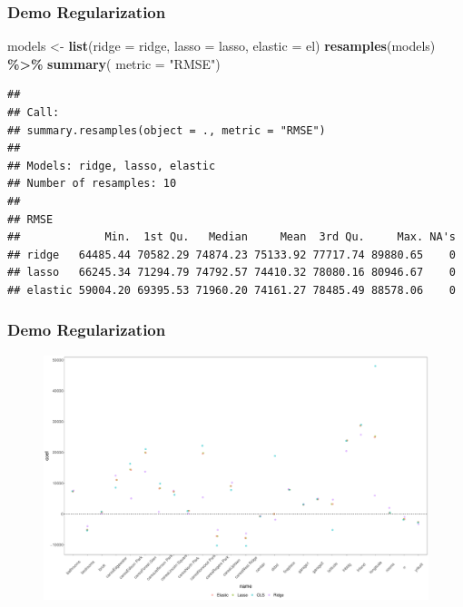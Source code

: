 \documentclass[
  shownotes,
  xcolor={svgnames},
  hyperref={colorlinks,citecolor=DarkBlue,linkcolor=DarkRed,urlcolor=DarkBlue}
  ]{beamer}
\newenvironment{Shaded}{\begin{snugshade}}{\end{snugshade}}
\newcommand{\DataTypeTok}[1]{\textcolor[rgb]{0.13,0.29,0.53}{#1}}
\newcommand{\KeywordTok}[1]{\textcolor[rgb]{0.13,0.29,0.53}{\textbf{#1}}}
\newcommand{\NormalTok}[1]{#1}
\newcommand{\OperatorTok}[1]{\textcolor[rgb]{0.81,0.36,0.00}{\textbf{#1}}}
\newcommand{\StringTok}[1]{\textcolor[rgb]{0.31,0.60,0.02}{#1}}
\begin{document}
\begin{frame}[fragile]
\frametitle{Demo Regularization}

\begin{scriptsize}
\begin{Shaded}
\begin{Highlighting}[]
\NormalTok{models \textless{}{-}}\StringTok{ }\KeywordTok{list}\NormalTok{(}\DataTypeTok{ridge =}\NormalTok{ ridge, }\DataTypeTok{lasso =}\NormalTok{ lasso, }\DataTypeTok{elastic =}\NormalTok{ el)}
\KeywordTok{resamples}\NormalTok{(models) }\OperatorTok{\%\textgreater{}\%}\StringTok{ }\KeywordTok{summary}\NormalTok{( }\DataTypeTok{metric =} \StringTok{"RMSE"}\NormalTok{)}
\end{Highlighting}
\end{Shaded}
\end{scriptsize}
\begin{tiny}
\begin{verbatim}
## 
## Call:
## summary.resamples(object = ., metric = "RMSE")
## 
## Models: ridge, lasso, elastic 
## Number of resamples: 10 
## 
## RMSE 
##             Min.  1st Qu.   Median     Mean  3rd Qu.     Max. NA's
## ridge   64485.44 70582.29 74874.23 75133.92 77717.74 89880.65    0
## lasso   66245.34 71294.79 74792.57 74410.32 78080.16 80946.67    0
## elastic 59004.20 69395.53 71960.20 74161.27 78485.49 88578.06    0
\end{verbatim}
\end{tiny}

\end{frame}

\begin{frame}[fragile]
\frametitle{Demo Regularization}

   \begin{figure}[H] \centering
            \captionsetup{justification=centering}
              \includegraphics[scale=0.2]{figures/comp}
 \end{figure}

 \end{frame}
\end{document}
